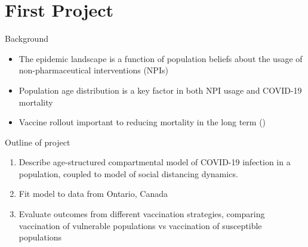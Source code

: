 \documentclass{beamer}
\begin{document}
\section{First Project}
\begin{frame}{Background}
    \begin{itemize}
        \item The epidemic landscape is a function of population beliefs about the usage of non-pharmaceutical interventions (NPIs)  
        \item Population age distribution is a key factor in both NPI usage and COVID-19 mortality
        \item Vaccine rollout important to reducing mortality in the long term (\cite{bubar2020model,hoyt2020vaccine})
    \end{itemize}
\end{frame}
\begin{frame}

    Outline of project
    \begin{enumerate}
        \item Describe age-structured compartmental model of COVID-19 infection in a population, coupled to model of social distancing dynamics. 
        \item Fit model to data from Ontario, Canada
        \item Evaluate outcomes from different vaccination strategies, comparing vaccination of vulnerable populations vs vaccination of susceptible populations
    \end{enumerate}
\end{frame}
\end{document}
